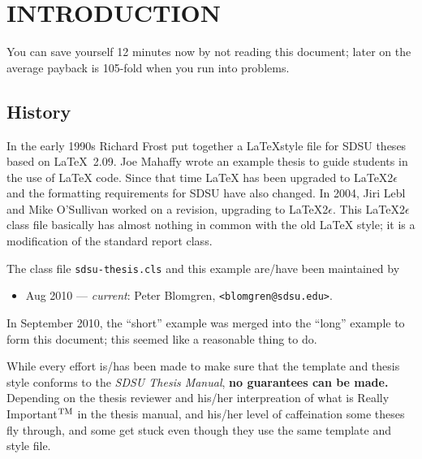 %

\chapter{INTRODUCTION}
\label{chap:intro}

You can save yourself 12 minutes now by not reading this document;
later on the average payback is 105-fold when you run into problems.

\section{History}

In the early 1990s Richard Frost put together a \LaTeX style file for
SDSU theses based on \LaTeX~2.09.  Joe Mahaffy wrote an example thesis
to guide students in the use of \LaTeX{} code.  Since that time \LaTeX
has been upgraded to \LaTeX2$\epsilon$ and the formatting requirements
for SDSU have also changed.  In 2004, Jiri Lebl and Mike O'Sullivan
worked on a revision, upgrading to \LaTeX2$\epsilon$.  This
\LaTeX2$\epsilon$ class file basically has almost nothing in common
with the old \LaTeX{} style; it is a modification of the standard
report class.

The class file \verb+sdsu-thesis.cls+ and this example are/have been
maintained by
\begin{itemize}
\item Aug 2010 --- \emph{current}: Peter Blomgren,
  \verb+<blomgren@sdsu.edu>+.
\end{itemize}

In September 2010, the ``short'' example was merged into the ``long''
example to form this document; this seemed like a reasonable thing to
do.

While every effort is/has been made to make sure that the template and
thesis style conforms to the \emph{SDSU Thesis Manual}, \textbf{no
guarantees can be made.}  Depending on the thesis reviewer and his/her
interpreation of what is Really Important$^{\hbox{\scriptsize TM}}$ in
the thesis manual, and his/her level of caffeination some theses fly
through, and some get stuck even though they use the same template and
style file.

